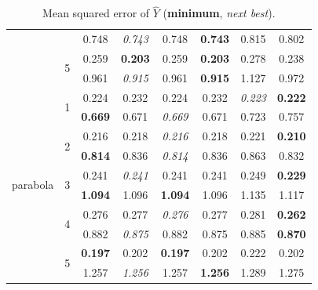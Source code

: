 \documentclass[authoryear, review, 11pt]{elsarticle}
\begin{document}
\begin{table}
\begin{center}
\begin{tabular}{cccccccc}
   &  & 0.748 & \emph{0.743} & 0.748 & \textbf{0.743} & 0.815 & 0.802 \\ 
   \cline{3-8}
   & \multirow{2}{*}{5} & 0.259 & \textbf{0.203} & 0.259 & \textbf{0.203} & 0.278 & 0.238 \\ 
   &  & 0.961 & \emph{0.915} & 0.961 & \textbf{0.915} & 1.127 & 0.972 \\ 
   \hline
  \multirow{10}{*}{parabola} & \multirow{2}{*}{1} & 0.224 & 0.232 & 0.224 & 0.232 & \emph{0.223} & \textbf{0.222} \\ 
   &  & \textbf{0.669} & 0.671 & \emph{0.669} & 0.671 & 0.723 & 0.757 \\ 
   \cline{3-8}
   & \multirow{2}{*}{2} & 0.216 & 0.218 & \emph{0.216} & 0.218 & 0.221 & \textbf{0.210} \\ 
   &  & \textbf{0.814} & 0.836 & \emph{0.814} & 0.836 & 0.863 & 0.832 \\ 
   \cline{3-8}
   & \multirow{2}{*}{3} & 0.241 & \emph{0.241} & 0.241 & 0.241 & 0.249 & \textbf{0.229} \\ 
   &  & \textbf{1.094} & 1.096 & \textbf{1.094} & 1.096 & 1.135 & 1.117 \\ 
   \cline{3-8}
   & \multirow{2}{*}{4} & 0.276 & 0.277 & \emph{0.276} & 0.277 & 0.281 & \textbf{0.262} \\ 
   &  & 0.882 & \emph{0.875} & 0.882 & 0.875 & 0.885 & \textbf{0.870} \\ 
   \cline{3-8}
   & \multirow{2}{*}{5} & \textbf{0.197} & 0.202 & \textbf{0.197} & 0.202 & 0.222 & 0.202 \\ 
   &  & 1.257 & \emph{1.256} & 1.257 & \textbf{1.256} & 1.289 & 1.275 \\ 
  \end{tabular}
\caption{Mean squared error of $\hat{Y}$ (\textbf{minimum}, \emph{next best}).\label{table:Y-mse}} 
\end{center}
\end{table}
		
	
\end{document}
